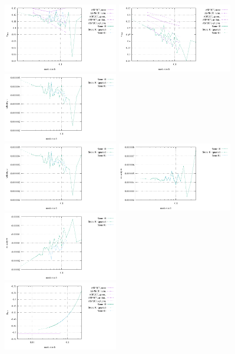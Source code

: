 \begin{center}
\includegraphics[width=5cm]{images/stokes_sphere3D/vrms_FS}
\includegraphics[width=5cm]{images/stokes_sphere3D/max_vel_FS}
\includegraphics[width=5cm]{images/stokes_sphere3D/max_u_FS}\\
\includegraphics[width=5cm]{images/stokes_sphere3D/max_v_FS}
\includegraphics[width=5cm]{images/stokes_sphere3D/max_w_FS}
\includegraphics[width=5cm]{images/stokes_sphere3D/min_w_FS}\\
\includegraphics[width=5cm]{images/stokes_sphere3D/pressure_min_FS}

\end{center}
